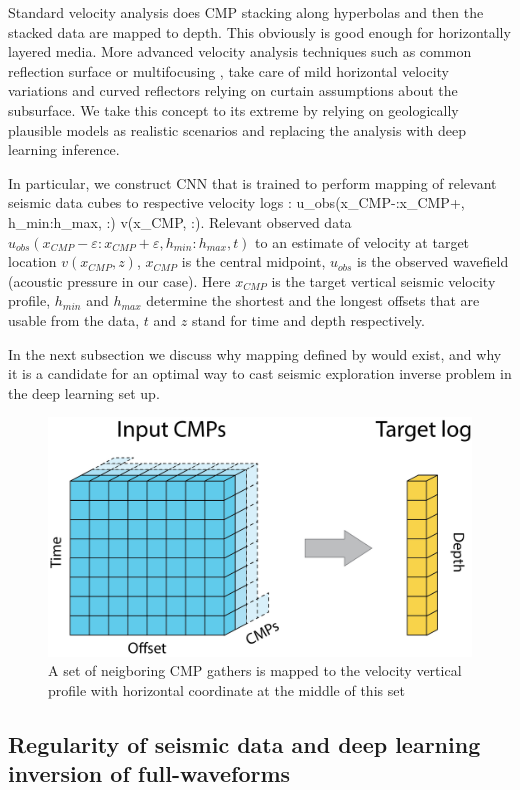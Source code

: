 \documentclass[paper,twocolomn]{geophysics}
\begin{document}
Standard velocity analysis does CMP stacking along hyperbolas and then the stacked data are mapped to depth. This obviously is good enough for horizontally layered media. More advanced velocity analysis techniques such as common reflection surface  \citep{mann1999common} or multifocusing \citep{gelchinsky1999multifocusing}, take care of mild horizontal velocity variations and curved reflectors relying on curtain assumptions about the subsurface. We take this concept to its extreme by relying on geologically plausible models as realistic scenarios and replacing the analysis with deep learning inference.

In particular, we construct CNN that is trained to perform mapping of relevant seismic data cubes to respective velocity logs : 
\beq \label{eq:mapping}
u_{obs}(x_{CMP}-\varepsilon:x_{CMP}+\varepsilon, h_{min}:h_{max}, :) \to v(x_{CMP}, :).
\eeq
Relevant observed data $u_{obs}(x_{CMP}-\varepsilon:x_{CMP}+\varepsilon, h_{min}:h_{max}, t)$  
to an estimate of velocity at target location $v(x_{CMP}, z)$, $x_{CMP}$ is the central midpoint,
$u_{obs}$ is the observed wavefield (acoustic pressure in our case). Here $x_{CMP}$ is the target vertical seismic velocity profile, $h_{min}$ and $h_{max}$ determine the shortest and the longest offsets that are usable from the data, $t$ and $z$ stand for time and depth respectively.

In the next subsection we discuss why mapping defined by  would exist, and why it is a candidate for an optimal way to cast seismic exploration inverse problem in the deep learning set up.  
\begin{figure}[h!]
	\centering
	\includegraphics[width=0.7\linewidth]{Fig/in_out_shape}
	\caption{A set of neigboring CMP gathers is mapped to the velocity vertical profile with horizontal coordinate at the middle of this set}
	\label{fig:in_out}
\end{figure}

\subsection{Regularity of seismic data and deep learning inversion of full-waveforms}
\end{document}
